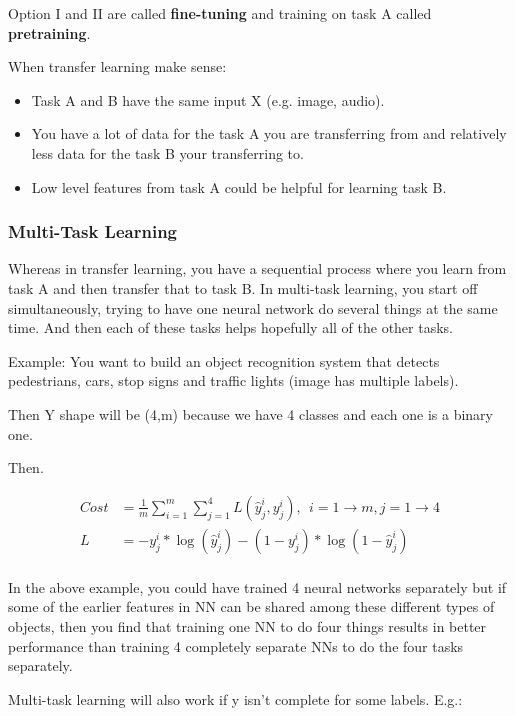 Option I and II are called \textbf{fine-tuning} and training on task A called \textbf{pretraining}.

When transfer learning make sense:

\begin{itemize}
    \item Task A and B have the same input X (e.g. image, audio).
    \item You have a lot of data for the task A you are transferring from and relatively less data for the task B your transferring to.
    \item Low level features from task A could be helpful for learning task B.
\end{itemize}

\subsubsection{Multi-Task Learning}
Whereas in transfer learning, you have a sequential process where you learn from task A and then transfer that to task B. In multi-task learning, you start off simultaneously, trying to have one neural network do several things at the same time. And then each of these tasks helps hopefully all of the other tasks.

Example: You want to build an object recognition system that detects pedestrians, cars, stop signs and traffic lights (image has multiple labels).

Then Y shape will be (4,m) because we have 4 classes and each one is a binary one.

Then.

\begin{equation}
\begin{aligned}
    Cost &= \frac{1}{m} \sum^m_{i=1}\sum_{j=1}^{4} L(\hat{y}^{i}_j, y^{i}_j), \ \ i = 1\to m, j = 1\to 4\\
    L &= - y^i_j * \log (\hat{y}^i_j) - (1 - y^i_j) * \log (1 - \hat{y}^i_j)\\
\end{aligned}
\end{equation}

In the above example, you could have trained 4 neural networks separately but if some of the earlier features in NN can be shared among these different types of objects, then you find that training one NN to do four things results in better performance than training 4 completely separate NNs to do the four tasks separately.

Multi-task learning will also work if y isn't complete for some labels. E.g.:

